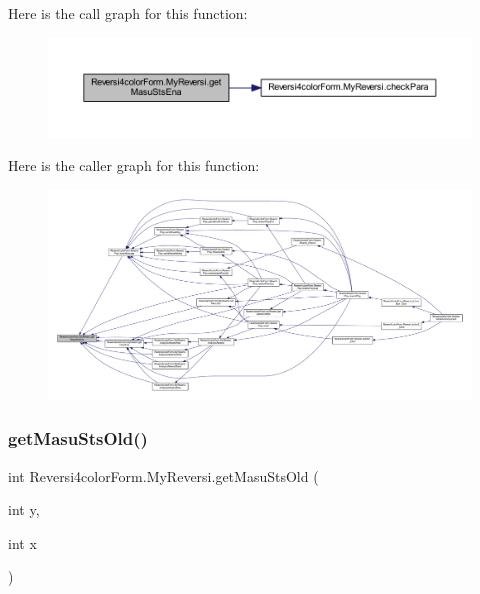 Here is the call graph for this function\+:
\nopagebreak
\begin{figure}[H]
\begin{center}
\leavevmode
\includegraphics[width=350pt]{class_reversi4color_form_1_1_my_reversi_ac17f7f56dd24fa06ac8d394290feafef_cgraph}
\end{center}
\end{figure}
Here is the caller graph for this function\+:
\nopagebreak
\begin{figure}[H]
\begin{center}
\leavevmode
\includegraphics[width=350pt]{class_reversi4color_form_1_1_my_reversi_ac17f7f56dd24fa06ac8d394290feafef_icgraph}
\end{center}
\end{figure}
\mbox{\label{class_reversi4color_form_1_1_my_reversi_aa56088eff96a48e68d4c7f688fe06b8d}} 
\subsubsection{\texorpdfstring{get\+Masu\+Sts\+Old()}{getMasuStsOld()}}
{\footnotesize\ttfamily int Reversi4color\+Form.\+My\+Reversi.\+get\+Masu\+Sts\+Old (\begin{DoxyParamCaption}\item[{int}]{y,  }\item[{int}]{x }\end{DoxyParamCaption})}



